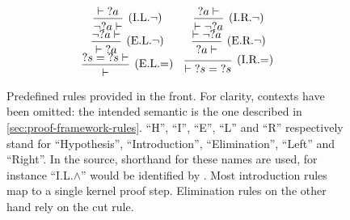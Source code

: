 \begin{figure}[H]
$$\begin{array}{c c}
  \frule{\vdash {?a}}{\neg {?a} \vdash}{I.L.$\neg$} & \frule{{?a} \vdash}{\vdash \neg {?a}}{I.R.$\neg$} \\
  \frule{\neg {?a} \vdash}{\vdash {?a}}{E.L.$\neg$} & \frule{\vdash \neg {?a}}{{?a} \vdash}{E.R.$\neg$} \\
  \frule{{?s} = {?s} \vdash}{\vdash}{E.L.$=$} & \frule{}{\vdash {?s} = {?s}}{I.R.$=$}
  \end{array}$$
  \caption[Rules (1)]{Predefined rules provided in the front. For clarity, contexts have been omitted: the intended semantic is the one described in \autoref{sec:proof-framework-rules}. ``H'', ``I'', ``E'', ``L'' and ``R'' respectively stand for ``Hypothesis'', ``Introduction'', ``Elimination'', ``Left'' and ``Right''. In the source, shorthand for these names are used, for instance ``I.L.$\land$'' would be identified by . Most introduction rules map to a single kernel proof step. Elimination rules on the other hand rely on the cut rule.}
  \label{fig:rules-list-1}
\end{figure}

